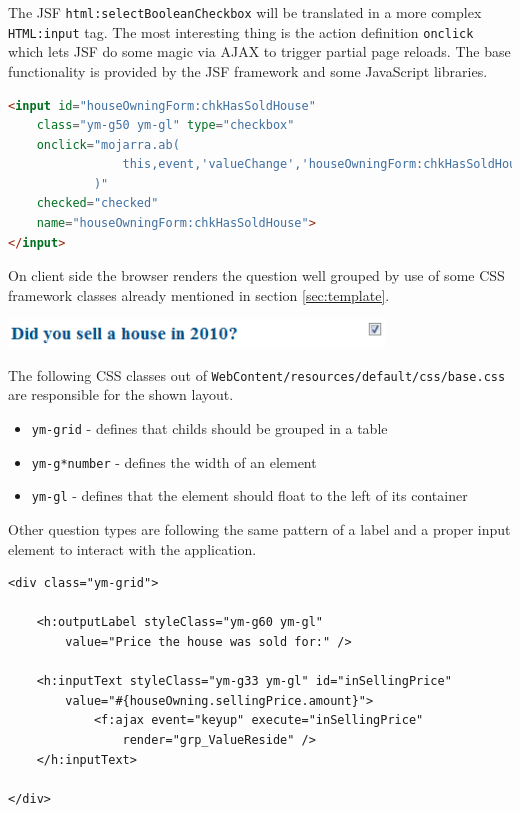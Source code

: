 The JSF \texttt{html:selectBooleanCheckbox} will be translated in a more complex
\texttt{HTML:input} tag. The most interesting thing is the action definition
\texttt{onclick} which lets JSF do some magic via AJAX to trigger partial page
reloads. The base functionality is provided by the JSF framework and some
JavaScript libraries.

\begin{lstlisting}[language=HTML]
<input id="houseOwningForm:chkHasSoldHouse" 
	class="ym-g50 ym-gl" type="checkbox"
	onclick="mojarra.ab(
				this,event,'valueChange','houseOwningForm:chkHasSoldHouse','houseOwningForm:grp_hasSoldHouse_hasBoughtHouse'
			)"
	checked="checked" 
	name="houseOwningForm:chkHasSoldHouse">
</input>
\end{lstlisting}
    
On client side the browser renders the question well grouped by use of some CSS
framework classes already mentioned in section \ref{sec:template}. 

\begin{center}
 \includegraphics[width=10cm]{./images/chapter02/referenceimpl_forms_bool.png}
\end{center}

The following CSS classes out of
\texttt{WebContent/resources/default/css/base.css} are responsible for the shown
layout.

\begin{itemize}
  \item \texttt{ym-grid} - defines that childs should be grouped in a table
  \item \texttt{ym-g*number} - defines the width of an element
  \item \texttt{ym-gl} - defines that the element should float to the left of its
  container
\end{itemize}

Other question types are following the same pattern of a label and a proper
input element to interact with the application.

\begin{lstlisting}[language=XHTML]
<div class="ym-grid">

	<h:outputLabel styleClass="ym-g60 ym-gl"
		value="Price the house was sold for:" />

	<h:inputText styleClass="ym-g33 ym-gl" id="inSellingPrice"
		value="#{houseOwning.sellingPrice.amount}">
			<f:ajax event="keyup" execute="inSellingPrice"
				render="grp_ValueReside" />
	</h:inputText>

</div>
\end{lstlisting}

